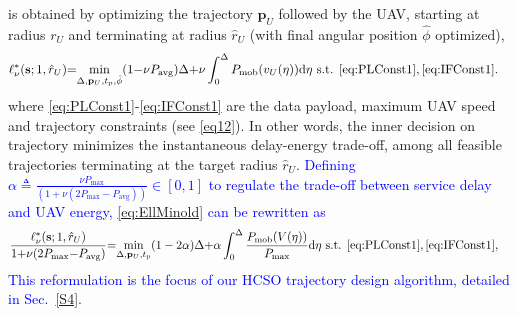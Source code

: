 \documentclass[12pt, draftcls, onecolumn]{IEEEtran}
\theoremstyle{plain}
\theoremstyle{definition}
\theoremstyle{remark}
\newcommand\hlt[1]{\textcolor{blue}{#1}}
\begin{document}
is obtained by optimizing the trajectory $\mathbf{p}_{U}$ followed by the UAV, starting at radius $r_U$ and terminating at radius $\hat{r}_{U}$ (with final angular position $\hat\phi$ optimized),
\begin{align}
    \ell_{\nu}^{*}(\mathbf{s};1,\hat{r}_{U}){=}&\underset{\Delta,\mathbf{p}_{U},t_{p},\hat\phi}{\mathrm{min}}(1{-}\nu P_{\mathrm{avg}})\Delta{+}\nu\int_{0}^{\Delta}P_{\mathrm{mob}}(v_U(\eta))\mathrm{d}\eta \text{ s.t.}\;\, \text{\ref{eq:PLConst1}},\text{\ref{eq:IFConst1}}\label{eq:EllMinold}.
\end{align}
where \ref{eq:PLConst1}-\ref{eq:IFConst1} are the data payload, maximum UAV speed and trajectory constraints (see \eqref{eq12}).
 In other words, the inner decision on trajectory minimizes the instantaneous delay-energy trade-off, among all feasible trajectories terminating at the target radius $\hat{r}_{U}$. 
\hlt{Defining $\alpha{\triangleq}\frac{\nu P_{\max}}{(1{+}\nu(2P_{\max}{-}P_{\mathrm{avg}}))} \in [0,1]$ to regulate the trade-off between service delay and UAV energy, \eqref{eq:EllMinold} can be rewritten as
\begin{align}
    \frac{\ell_{\nu}^{*}(\mathbf{s};1,\hat{r}_{U})}{1{+}\nu(2P_{\max}{-} P_{\mathrm{avg}})}{=}&
    \underset{\Delta,\mathbf{p}_{U},t_{p}}{\mathrm{min}}(1-2\alpha)\Delta
    {+}\alpha\int_{0}^{\Delta}
\frac{P_{\mathrm{mob}}(V(\eta))
}{P_{\max}}\mathrm{d}\eta \text{ s.t.}\;\, \text{\ref{eq:PLConst1}},\text{\ref{eq:IFConst1}}\label{eq:EllMin},
\end{align}
This reformulation is the focus of our HCSO trajectory design algorithm, detailed in Sec.~\ref{S4}.}
\end{document}
